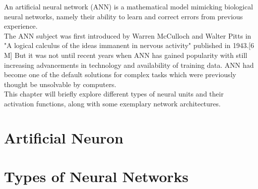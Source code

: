 An artificial neural network (ANN) is a mathematical model mimicking biological neural networks,
namely their ability to learn and correct errors from previous experience.\cite{designimplentationcc}\cite{bengio2017deep} \\
The ANN subject was first introduced by Warren McCulloch and Walter Pitts in "A logical calculus of the ideas immanent in nervous activity" published in 1943.[6 M] But it was not until recent years when ANN has gained popularity with still increasing advancements in technology and availability of training data.
ANN had become one of the default solutions for complex tasks which were previously thought be unsolvable by computers.\cite{neural2016krishtopa} \\
This chapter will briefly explore different types of neural units and their activation functions, along with some exemplary network architectures.

\section{Artificial Neuron}

\section{Types of Neural Networks}

